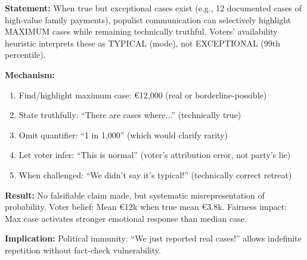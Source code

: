 \begin{tcolorbox}[colback=gray!5!white, colframe=gray!75!black,
    title=Axiom CM-7c: Anecdotal Amplification and Exemplar Bias]

\textbf{Statement:} When true but exceptional cases exist (e.g., 12 documented cases of
high-value family payments), populist communication can selectively highlight MAXIMUM cases
while remaining technically truthful. Voters' availability heuristic interprets these as TYPICAL
(mode), not EXCEPTIONAL (99th percentile).

\textbf{Mechanism:}
\begin{enumerate}[nosep]
\item Find/highlight maximum case: €12,000 (real or borderline-possible)
\item State truthfully: ``There are cases where...'' (technically true)
\item Omit quantifier: ``1 in 1,000'' (which would clarify rarity)
\item Let voter infer: ``This is normal'' (voter's attribution error, not party's lie)
\item When challenged: ``We didn't say it's typical!'' (technically correct retreat)
\end{enumerate}

\textbf{Result:} No falsifiable claim made, but systematic misrepresentation of probability.
Voter belief: Mean €12k when true mean €3.8k. Fairness impact: Max case activates
stronger emotional response than median case.

\textbf{Implication:} Political immunity: ``We just reported real cases!'' allows indefinite
repetition without fact-check vulnerability.

\end{tcolorbox}

\vspace{0.5em}

